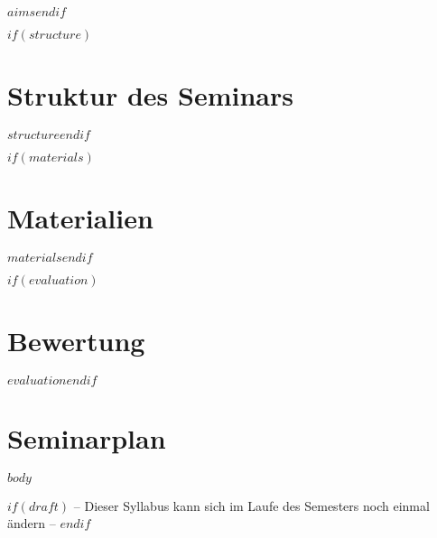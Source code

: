 \documentclass[11pt,a4paper]{article}
\begin{document}
$aims$$endif$

$if(structure)$\section*{Struktur des Seminars}

$structure$$endif$

$if(materials)$\section*{Materialien}

$materials$$endif$

$if(evaluation)$\section*{Bewertung}

$evaluation$$endif$


\section*{Seminarplan}

$body$

$if(draft)$
\centering
	-- Dieser Syllabus kann sich im Laufe des Semesters noch einmal ändern --
$endif$
\end{document}
